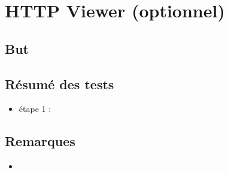 \section{HTTP Viewer (optionnel)}

\subsection{But}

\subsection{Résumé des tests}
\begin{itemize}
  \item étape 1 :
\end{itemize}


\subsection{Remarques}
\begin{itemize}
  \item 
\end{itemize}